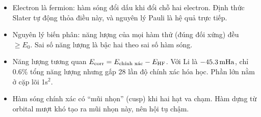 \begin{ghinho}
\begin{itemize}
\item Electron là fermion: hàm sóng đổi dấu khi đổi chỗ hai electron. Định thức Slater tự động thỏa điều này, và nguyên lý Pauli là hệ quả trực tiếp.
\item Nguyên lý biến phân: năng lượng của mọi hàm thử (đúng đối xứng) đều $\ge E_0$. Sai số năng lượng là bậc hai theo sai số hàm sóng.
\item Năng lượng tương quan $E_{\mathrm{corr}}=E_{\text{chính xác}}-E_{\mathrm{HF}}$. Với Li là $-45.3\,\mathrm{mHa}$, chỉ 0.6\% tổng năng lượng nhưng gấp 28 lần độ chính xác hóa học. Phần lớn nằm ở cặp lõi 1s$^2$.
\item Hàm sóng chính xác có ``mũi nhọn'' (cusp) khi hai hạt va chạm. Hàm dựng từ orbital mượt khó tạo ra mũi nhọn này, nên hội tụ chậm.
\end{itemize}
\end{ghinho}
